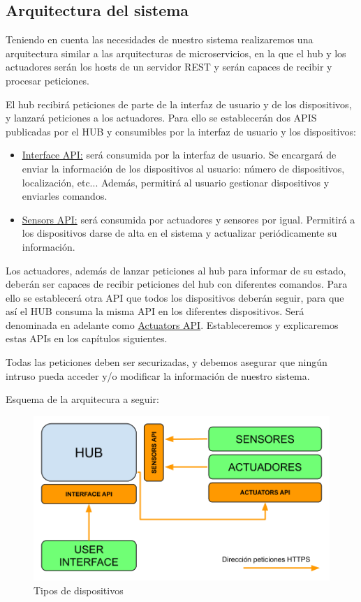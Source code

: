 \subsection{Arquitectura del sistema}
Teniendo en cuenta las necesidades de nuestro sistema realizaremos una arquitectura similar a las arquitecturas de microservicios,
en la que el hub y los actuadores serán los hosts de un servidor REST y serán capaces de recibir y procesar peticiones.
\par
El hub recibirá peticiones de parte de la interfaz de usuario y de los dispositivos, y lanzará peticiones a los actuadores.
Para ello se establecerán dos APIS publicadas por el HUB y consumibles por la interfaz de usuario y los dispositivos:
\begin{itemize}
\item \underline{Interface API:} será consumida por la interfaz de usuario. Se encargará de enviar la información de los dispositivos al usuario: número
 de dispositivos, localización, etc... Además, permitirá al usuario gestionar dispositivos y enviarles comandos.
\item \underline{Sensors API:} será consumida por actuadores y sensores por igual. Permitirá a los dispositivos darse de alta en el sistema y actualizar
periódicamente su información.
\end{itemize}
Los actuadores, además de lanzar peticiones al hub para informar de su estado, deberán ser capaces de recibir peticiones del hub con
diferentes comandos. Para ello se establecerá otra API que todos los dispositivos deberán seguir, para que así el HUB consuma la misma API
en los diferentes dispositivos. Será denominada en adelante como \underline{Actuators API}. Estableceremos y explicaremos estas APIs en los capítulos siguientes.
\par
Todas las peticiones deben ser securizadas, y debemos asegurar que ningún intruso pueda acceder y/o modificar la información de nuestro sistema.

Esquema de la arquitecura a seguir:
\begin{figure}[H]
\centering
\includegraphics[width=6.00in]{images/esquema_arquitectura.png}
\caption{Tipos de dispositivos}
\label{fig:descripcion_dispositivos}
\end{figure}

